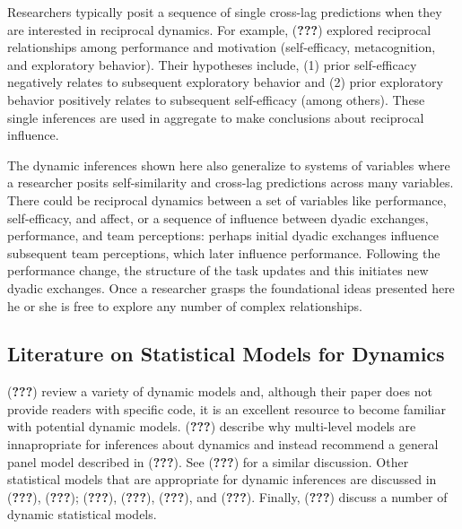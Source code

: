 \documentclass[english,,man]{apa6}
\begin{document}
Researchers typically posit a sequence of single cross-lag predictions when they are interested in reciprocal dynamics. For example, ({\textbf{???}}) explored reciprocal relationships among performance and motivation (self-efficacy, metacognition, and exploratory behavior). Their hypotheses include, (1) prior self-efficacy negatively relates to subsequent exploratory behavior and (2) prior exploratory behavior positively relates to subsequent self-efficacy (among others). These single inferences are used in aggregate to make conclusions about reciprocal influence.

The dynamic inferences shown here also generalize to systems of variables where a researcher posits self-similarity and cross-lag predictions across many variables. There could be reciprocal dynamics between a set of variables like performance, self-efficacy, and affect, or a sequence of influence between dyadic exchanges, performance, and team perceptions: perhaps initial dyadic exchanges influence subsequent team perceptions, which later influence performance. Following the performance change, the structure of the task updates and this initiates new dyadic exchanges. Once a researcher grasps the foundational ideas presented here he or she is free to explore any number of complex relationships.

\hypertarget{literature-on-statistical-models-for-dynamics}{%
\subsection{Literature on Statistical Models for Dynamics}\label{literature-on-statistical-models-for-dynamics}}

({\textbf{???}}) review a variety of dynamic models and, although their paper does not provide readers with specific code, it is an excellent resource to become familiar with potential dynamic models. ({\textbf{???}}) describe why multi-level models are innapropriate for inferences about dynamics and instead recommend a general panel model described in ({\textbf{???}}). See ({\textbf{???}}) for a similar discussion. Other statistical models that are appropriate for dynamic inferences are discussed in ({\textbf{???}}), ({\textbf{???}}); ({\textbf{???}}), ({\textbf{???}}), ({\textbf{???}}), and ({\textbf{???}}). Finally, ({\textbf{???}}) discuss a number of dynamic statistical models.
\end{document}
